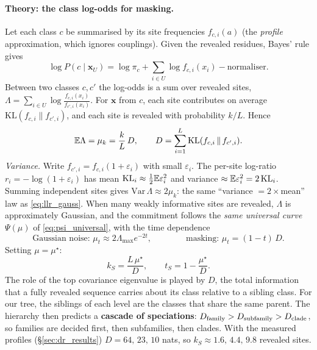 \paragraph{Theory: the class log-odds for masking.} Let each class $c$ be summarised by its site frequencies
$f_{c,i}(a)$ (the \emph{profile} approximation, which ignores couplings). Given the revealed residues, Bayes' rule
gives
\begin{equation}\label{eq:profile_post}
\log P(c\mid\bm x_U)=\log\pi_c+\sum_{i\in U}\log f_{c,i}(x_i)-\text{normaliser}.
\end{equation}
Between two classes $c,c'$ the log-odds is a sum over revealed sites,
$\Lambda=\sum_{i\in U}\log\frac{f_{c,i}(x_i)}{f_{c',i}(x_i)}$. For $\bm x$ from $c$, each site contributes on average
$\mathrm{KL}(f_{c,i}\|f_{c',i})$, and each site is revealed with probability $k/L$. Hence
\begin{equation}\label{eq:mu_mask}
\mathbb{E}\Lambda=\mu_k=\frac kL\,D,\qquad D=\sum_{i=1}^L\mathrm{KL}(f_{c,i}\,\|\,f_{c',i}).
\end{equation}
\emph{Variance.} Write $f_{c',i}=f_{c,i}(1+\varepsilon_i)$ with small $\varepsilon_i$. The per-site log-ratio
$r_i=-\log(1+\varepsilon_i)$ has mean $\mathrm{KL}_i\approx\frac12\mathbb{E}\varepsilon_i^2$ and variance
$\approx\mathbb{E}\varepsilon_i^2=2\,\mathrm{KL}_i$. Summing independent sites gives $\mathrm{Var}\,\Lambda\approx2\mu_k$: the
same ``variance $=2\times$mean'' law as \eqref{eq:llr_gauss}. When many weakly informative sites are revealed,
$\Lambda$ is approximately Gaussian, and the commitment follows the \emph{same universal curve} $\Psi(\mu)$ of
\eqref{eq:psi_universal}, with the time dependence
\begin{equation}\label{eq:snr_compare}
\text{Gaussian noise: }\mu_t\approx2\Lambda_{\max}e^{-2t},\qquad\qquad\text{masking: }\mu_t=(1-t)\,D.
\end{equation}
Setting $\mu=\mu^\star$:
\begin{equation}\label{eq:ts_mask}
\boxed{k_S=\frac{L\,\mu^\star}{D},\qquad t_S=1-\frac{\mu^\star}{D}.}
\end{equation}
The role of the top covariance eigenvalue is played by $D$, the total information that a fully revealed sequence
carries about its class relative to a sibling class. For our tree, the siblings of each level are the classes that
share the same parent. The hierarchy then predicts a \textbf{cascade of speciations}:
$D_{\rm family}>D_{\rm subfamily}>D_{\rm clade}$, so families are decided first, then subfamilies, then clades. With
the measured profiles (\S\ref{sec:dr_results}) $D=64,\,23,\,10$ nats, so
$k_S\approx1.6,\,4.4,\,9.8$ revealed sites.

